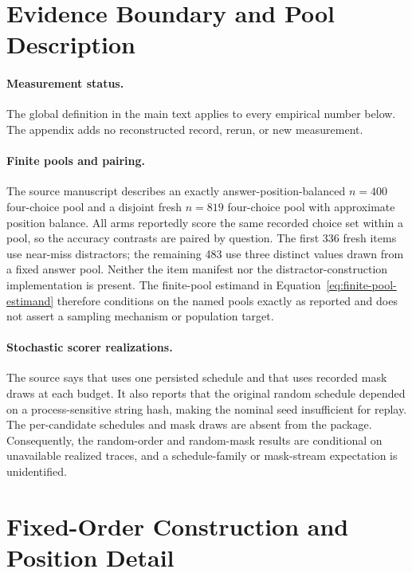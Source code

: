 \section{Evidence Boundary and Pool Description}
\label{app:evidence-boundary}

\paragraph{Measurement status.}
The global \srcv{} definition in the main text applies to every empirical
number below.  The appendix adds no reconstructed record, rerun, or new
measurement.

\paragraph{Finite pools and pairing.}
The source manuscript describes an exactly answer-position-balanced
$n=400$ four-choice pool and a disjoint fresh $n=819$ four-choice pool with
approximate position balance.  All arms reportedly score the same recorded
choice set within a pool, so the accuracy contrasts are paired by question.
The first 336 fresh items use near-miss distractors; the remaining 483 use
three distinct values drawn from a fixed answer pool.  Neither the item
manifest nor the distractor-construction implementation is present.  The
finite-pool estimand in Equation~\ref{eq:finite-pool-estimand} therefore
conditions on the named pools exactly as reported and does not assert a
sampling mechanism or population target.

\paragraph{Stochastic scorer realizations.}
The source says that \rinj{} uses one persisted schedule and that \mcu{} uses
recorded mask draws at each budget.  It also reports that the original random
schedule depended on a process-sensitive string hash, making the nominal seed
insufficient for replay.  The per-candidate schedules and mask draws are absent
from the package.  Consequently, the random-order and random-mask results are
conditional on unavailable realized traces, and a schedule-family or
mask-stream expectation is unidentified.

\section{Fixed-Order Construction and Position Detail}
\label{app:fixed-detail}

